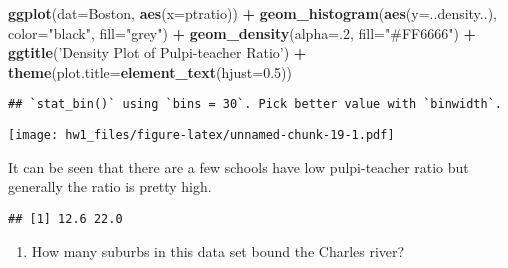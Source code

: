 \documentclass[]{article}
\newenvironment{Shaded}{\begin{snugshade}}{\end{snugshade}}
\newcommand{\DataTypeTok}[1]{\textcolor[rgb]{0.13,0.29,0.53}{#1}}
\newcommand{\DecValTok}[1]{\textcolor[rgb]{0.00,0.00,0.81}{#1}}
\newcommand{\FloatTok}[1]{\textcolor[rgb]{0.00,0.00,0.81}{#1}}
\newcommand{\KeywordTok}[1]{\textcolor[rgb]{0.13,0.29,0.53}{\textbf{#1}}}
\newcommand{\NormalTok}[1]{#1}
\newcommand{\OperatorTok}[1]{\textcolor[rgb]{0.81,0.36,0.00}{\textbf{#1}}}
\newcommand{\StringTok}[1]{\textcolor[rgb]{0.31,0.60,0.02}{#1}}
\providecommand{\tightlist}{%
  \setlength{\itemsep}{0pt}\setlength{\parskip}{0pt}}
\begin{document}
\begin{Shaded}
\begin{Highlighting}[]
\KeywordTok{ggplot}\NormalTok{(}\DataTypeTok{dat=}\NormalTok{Boston, }\KeywordTok{aes}\NormalTok{(}\DataTypeTok{x=}\NormalTok{ptratio)) }\OperatorTok{+}\StringTok{ }\KeywordTok{geom_histogram}\NormalTok{(}\KeywordTok{aes}\NormalTok{(}\DataTypeTok{y=}\NormalTok{..density..), }\DataTypeTok{color=}\StringTok{"black"}\NormalTok{, }\DataTypeTok{fill=}\StringTok{"grey"}\NormalTok{) }\OperatorTok{+}\StringTok{ }\KeywordTok{geom_density}\NormalTok{(}\DataTypeTok{alpha=}\NormalTok{.}\DecValTok{2}\NormalTok{, }\DataTypeTok{fill=}\StringTok{"#FF6666"}\NormalTok{) }\OperatorTok{+}\StringTok{ }\KeywordTok{ggtitle}\NormalTok{(}\StringTok{'Density Plot of Pulpi-teacher Ratio'}\NormalTok{) }\OperatorTok{+}\StringTok{ }\KeywordTok{theme}\NormalTok{(}\DataTypeTok{plot.title=}\KeywordTok{element_text}\NormalTok{(}\DataTypeTok{hjust=}\FloatTok{0.5}\NormalTok{))}
\end{Highlighting}
\end{Shaded}

\begin{verbatim}
## `stat_bin()` using `bins = 30`. Pick better value with `binwidth`.
\end{verbatim}

\texttt{[image: hw1\_files/figure-latex/unnamed-chunk-19-1.pdf]}

It can be seen that there are a few schools have low pulpi-teacher ratio
but generally the ratio is pretty high.

\begin{Shaded}
\end{Shaded}

\begin{verbatim}
## [1] 12.6 22.0
\end{verbatim}

\begin{enumerate}
\def\labelenumi{(\alph{enumi})}
\setcounter{enumi}{4}
\tightlist
\item
  How many suburbs in this data set bound the Charles river?
\end{enumerate}

\begin{Shaded}
\end{Shaded}
\end{document}
